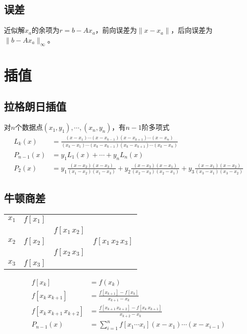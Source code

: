 \documentclass[twocolumn]{article}
\begin{document}
\subsection{误差}
近似解$x_a$的余项为$r=b-Ax_a$，前向误差为$\|x-x_a\|$，后向误差为$\|b-Ax_a\|_\infty$。

\section{插值}

\subsection{拉格朗日插值}
对$n$个数据点$(x_1,y_1),\cdots,(x_n,y_n)$，有$n-1$阶多项式
\begin{align*}
    L_k(x)     & =\frac{(x-x_1)\cdots(x-x_{k-1})(x-x_{k+1})\cdots(x-x_n)}{(x_k-x_1)\cdots(x_k-x_{k-1})(x_k-x_{k+1})\cdots(x_k-x_n)}                      \\
    P_{n-1}(x) & =y_1L_1(x)+\cdots+y_nL_n(x)                                                                                                             \\
    P_2(x)     & =y_1\frac{(x-x_2)(x-x_3)}{(x_1-x_2)(x_1-x_3)}+y_2\frac{(x-x_3)(x-x_1)}{(x_2-x_3)(x_2-x_1)}+y_3\frac{(x-x_1)(x-x_2)}{(x_3-x_1)(x_3-x_2)}
\end{align*}

\subsection{牛顿商差}
\begin{center}
    \begin{tabular}{c|ccc}
        $x_1$ & $f[x_1]$ &                 &                        \\
              &          & $f[x_1 \, x_2]$ &                        \\
        $x_2$ & $f[x_2]$ &                 & $f[x_1 \, x_2 \, x_3]$ \\
              &          & $f[x_2 \, x_3]$ &                        \\
        $x_3$ & $f[x_3]$ &                 &
    \end{tabular}
\end{center}
\begin{align*}
    f[x_k]                       & =f(x_k)                                                      \\
    f[x_k \, x_{k+1}]            & =\frac{f[x_{k+1}]-f[x_k]}{x_{k+1}-x_k}                       \\
    f[x_k \, x_{k+1} \, x_{k+2}] & =\frac{f[x_{k+1} \, x_{k+2}]-f[x_k \, x_{k+1}]}{x_{k+2}-x_k} \\
    P_{n-1}(x)                   & =\sum_{i=1}^n f[x_1\cdots x_i](x-x_1)\cdots(x-x_{i-1})
\end{align*}
\end{document}

